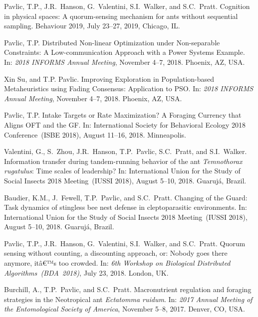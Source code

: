 \documentclass[10pt]{article}
\begin{document}
\begin{bibenum}
    \item Pavlic, T.P., J.R.~Hanson, G.~Valentini, S.I.~Walker, and
        S.C.~Pratt. Cognition in physical spaces: A quorum-sensing
        mechanism for ants without sequential sampling. Behaviour 2019,
        July 23--27, 2019, Chicago, IL.

    \item Pavlic, T.P. Distributed Non-linear Optimization under
        Non-separable Constraints: A Low-communication Approach with a
        Power Systems Example. In: \emph{2018 INFORMS Annual Meeting},
        November 4--7, 2018. Phoenix, AZ, USA.

    \item Xin Su, and T.P. Pavlic. Improving Exploration in
        Population-based Metaheuristics using Fading Consensus:
        Application to PSO. In: \emph{2018 INFORMS Annual Meeting},
        November 4--7, 2018. Phoenix, AZ, USA.

    \item Pavlic, T.P. Intake Targets or Rate Maximization? A Foraging
        Currency that Aligns OFT and the GF. In: International Society
        for Behavioral Ecology 2018 Conference~(ISBE 2018), August
        11--16, 2018. Minneapolis.

    \item Valentini, G., S.~Zhou, J.R.~Hanson, T.P.~Pavlic, S.C.~Pratt,
        and S.I.~Walker. Information transfer during tandem-running
        behavior of the ant \emph{Temnothorax rugatulus}: Time scales of
        leadership? In: International Union for the Study of Social
        Insects 2018 Meeting~(IUSSI 2018), August 5--10, 2018.
        Guaruj{\'{a}}, Brazil.

    \item Baudier, K.M., J.~Fewell, T.P.~Pavlic, and S.C.~Pratt.
        Changing of the Guard: Task dynamics of stingless bee nest
        defense in cleptoparasitic environments. In: International Union
        for the Study of Social Insects 2018 Meeting~(IUSSI 2018),
        August 5--10, 2018. Guaruj{\'{a}}, Brazil.

    \item Pavlic, T.P., J.R.~Hanson, G.~Valentini, S.I.~Walker, and
        S.C.~Pratt. Quorum sensing without counting, a discounting
        approach, or: Nobody goes there anymore, itâ€™s too crowded. In:
        \emph{6th Workshop on Biological Distributed
        Algorithms~(BDA~2018)}, July 23, 2018. London, UK.

    \item Burchill, A., T.P.~Pavlic, and S.C.~Pratt. Macronutrient
        regulation and foraging strategies in the Neotropical ant
        \emph{Ectatomma ruidum}. In: \emph{2017 Annual Meeting of the
        Entomological Society of America}, November 5--8, 2017. Denver,
        CO, USA.


\end{bibenum}
\end{document}
